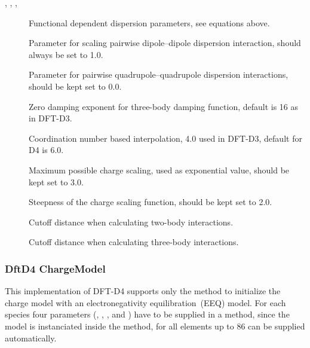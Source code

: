 \begin{description}
\item[, , , ] Functional dependent dispersion
  parameters, see equations above.
  
\item[] Parameter for scaling pairwise dipole--dipole dispersion
  interaction, should always be set to 1.0.

\item[] Parameter for pairwise quadrupole--quadrupole dispersion
  interactions, should be kept set to 0.0.

\item[] Zero damping exponent for three-body damping function, default
  is 16 as in DFT-D3.

\item[] Coordination number based interpolation, 4.0 used in
  DFT-D3, default for D4 is 6.0.

\item[] Maximum possible charge scaling, used as exponential
  value, should be kept set to 3.0.

\item[] Steepness of the charge scaling function, should be
  kept set to 2.0.

\item[]  Cutoff distance when
  calculating two-body interactions.

\item[]  Cutoff distance when
  calculating three-body interactions.

\end{description}

\subsubsection{DftD4 ChargeModel}
\label{sec:dftbp.ChargeModel}

This implementation of DFT-D4 supports only the  method to initialize
the charge model with an electronegativity equilibration~(EEQ) model.\cite{rappe1991}
For each species four parameters (, , , and )
have to be supplied in a  method, since the model
is instanciated inside the  method,  for all elements
up to 86 can be supplied automatically.\cite{caldeweyher-jcp-150-154122}

